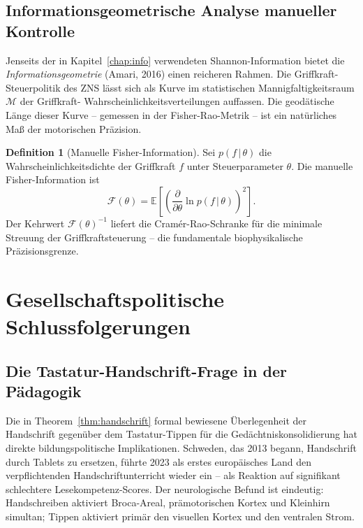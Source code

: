 ﻿\documentclass[12pt,a4paper]{report}
\theoremstyle{plain}
\theoremstyle{definition}
\newtheorem{definition}[theorem]{Definition}
\theoremstyle{remark}
\begin{document}
\subsection{Informationsgeometrische Analyse manueller Kontrolle}

Jenseits der in Kapitel~\ref{chap:info} verwendeten Shannon-Information
bietet die \emph{Informationsgeometrie} (Amari, 2016) einen reicheren
Rahmen. Die Griffkraft-Steuerpolitik des ZNS lässt sich als Kurve im
statistischen Mannigfaltigkeitsraum $\mathcal{M}$ der Griffkraft-
Wahrscheinlichkeitsverteilungen auffassen. Die geodätische Länge
dieser Kurve -- gemessen in der Fisher-Rao-Metrik -- ist ein natürliches
Maß der motorischen Präzision.

\begin{definition}[Manuelle Fisher-Information]
Sei $p(f\,|\,\theta)$ die Wahrscheinlichkeitsdichte der Griffkraft
$f$ unter Steuerparameter $\theta$. Die manuelle Fisher-Information ist
\begin{equation}
  \mathcal{F}(\theta) = \mathbb{E}\!\left[
    \left(\frac{\partial}{\partial\theta}\ln p(f\,|\,\theta)\right)^2
  \right].
\end{equation}
Der Kehrwert $\mathcal{F}(\theta)^{-1}$ liefert die Cramér-Rao-Schranke
für die minimale Streuung der Griffkraftsteuerung -- die fundamentale
biophysikalische Präzisionsgrenze.
\end{definition}

\section{Gesellschaftspolitische Schlussfolgerungen}

\subsection{Die Tastatur-Handschrift-Frage in der Pädagogik}

Die in Theorem~\ref{thm:handschrift} formal bewiesene Überlegenheit der
Handschrift gegenüber dem Tastatur-Tippen für die Gedächtniskonsolidierung
hat direkte bildungspolitische Implikationen. Schweden, das 2013 begann,
Handschrift durch Tablets zu ersetzen, führte 2023 als erstes europäisches
Land den verpflichtenden Handschriftunterricht wieder ein -- als Reaktion
auf signifikant schlechtere Lesekompetenz-Scores. Der neurologische
Befund ist eindeutig: Handschreiben aktiviert Broca-Areal, prämotorischen
Kortex und Kleinhirn simultan; Tippen aktiviert primär den visuellen
Kortex und den ventralen Strom.
\end{document}
